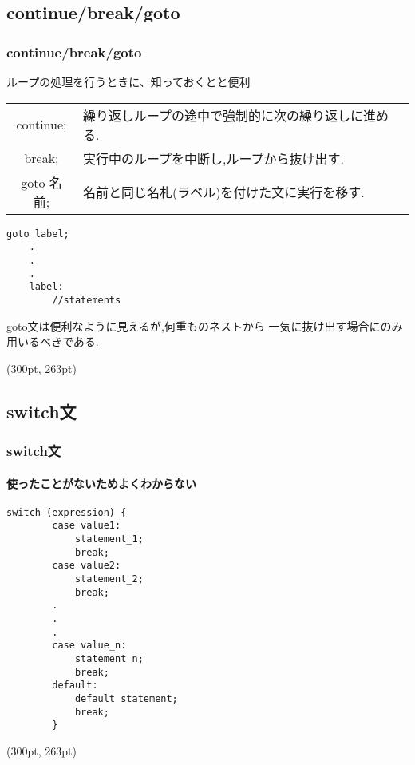 \documentclass[dvipdfmx]{beamer}
\begin{document}
\subsection{continue/break/goto}
\begin{frame}[t, fragile]
    \frametitle{continue/break/goto}
    ループの処理を行うときに、知っておくとと便利
    \begin{table}
    \centering
    \begin{tabular}{cl}
        \hline
        continue; & 繰り返しループの途中で強制的に次の繰り返しに進める.\\
        break; & 実行中のループを中断し,ループから抜け出す.\\
        goto 名前; & 名前と同じ名札(ラベル)を付けた文に実行を移す.\\
        \hline
    \end{tabular}
    \end{table}
    \begin{lstlisting}[gobble=3, caption=Syntax of goto statement, label=goto_howto]
    goto label;
    .
    .
    .
    label:
        //statements
    \end{lstlisting}
    goto文は便利なように見えるが,何重ものネストから
    一気に抜け出す場合にのみ用いるべきである.
    \begin{textblock*}{0.3\linewidth}(300pt, 263pt)
    \space
    \end{textblock*}
\end{frame}

\subsection{switch文}
\begin{frame}[t, fragile]
    \frametitle{switch文}
    \framesubtitle{使ったことがないためよくわからない}
    \begin{lstlisting}[gobble=6, caption=Syntax\space of\space switch\space statement, label=switch_howto]
        switch (expression) {
        case value1:
            statement_1;
            break;
        case value2:
            statement_2;
            break;
        .
        .
        .
        case value_n:
            statement_n;
            break;
        default:
            default statement;
            break;
        }
    \end{lstlisting}
    \begin{textblock*}{0.3\linewidth}(300pt, 263pt)
    \space
    \end{textblock*}
\end{frame}
\end{document}
